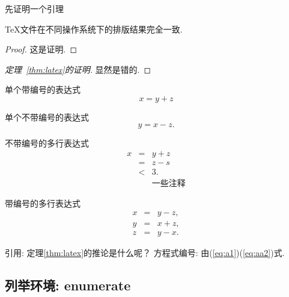 先证明一个引理
\begin{Lemma} \label{thm:tex}
\TeX 文件在不同操作系统下的排版结果完全一致.
\end{Lemma}

\begin{proof}
这是证明.
\end{proof}


\begin{proof}[定理~\ref{thm:latex}的证明]
显然是错的.
\end{proof}

单个带编号的表达式
\begin{equation}\label{eq:a1}
x=y+z
\end{equation}

单个不带编号的表达式
\[
y=x-z.
\]

不带编号的多行表达式
\begin{eqnarray*}
x&=&y+z \\
 &=&z-s\\
 &<& 3. \\
 && \mbox{一些注释}
\end{eqnarray*}

带编号的多行表达式
\begin{eqnarray}
 x&=& y-z, \label{eq:aa1}\\
 y&=& x+z, \nonumber \\
 z&=&y-x. \label{eq:aa2}
\end{eqnarray}



引用:   定理\ref{thm:latex}的推论是什么呢？
方程式编号:  由(\ref{eq:a1})(\ref{eq:aa2})式.

\subsection{列举环境:  enumerate}

